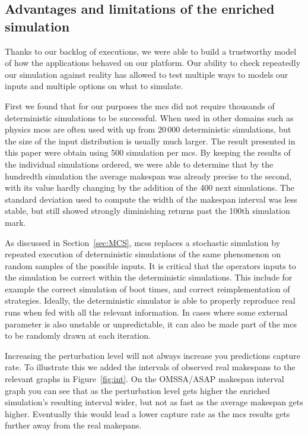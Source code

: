 \documentclass[10pt,conference,compsocconf]{IEEEtran}
\begin{document}
\subsection{Advantages and limitations of the enriched simulation}\label{sec:lim}

Thanks to our backlog of executions, we were able to build a trustworthy model
of how the applications behaved on our platform. Our ability to check repeatedly
our simulation against reality has allowed to test multiple ways to models our
inputs and multiple options on what to simulate. 

First we found that  for our purposes the \ac{mcs} did  not require thousands of
deterministic simulations to  be successful. When used in other  domains such as
physics \acp{mcs} are often used with up from 20\,000 deterministic simulations,
but  the size  of the  input  distribution is  usually much  larger. The  result
presented  in this  paper were  obtain using  500 simulation  per \ac{mcs}.   By
keeping  the results  of the  individual simulations  ordered, we  were able  to
determine  that by  the hundredth  simulation the  average makespan  was already
precise to the second, with its value hardly changing by the addition of the 400
next  simulations. The  standard  deviation used  to compute  the  width of  the
makespan interval was less stable, but still showed strongly diminishing returns
past the 100th simulation mark.

As discussed in Section~\ref{sec:MCS}, \aclp{mcs} replaces a stochastic
simulation by repeated execution of deterministic simulations of the same
phenomenon on random samples of the possible inputs. It is critical that the
operators inputs to the simulation be correct within the deterministic simulations.
This include for example the correct simulation of boot times, and correct
reimplementation of strategies. Ideally, the deterministic simulator is able to
properly reproduce real runs when fed with all the relevant information. In cases
where some external parameter is also unstable or unpredictable, it can also be
made part of the \ac{mcs} to be randomly drawn at each iteration.

Increasing the perturbation level will not always increase you predictions
capture rate. To illustrate this we added the intervals of observed real
makespans to the relevant graphs in Figure~\ref{fig:int}. On the OMSSA/ASAP
makespan interval graph you can see that as the perturbation level gets higher
the enriched simulation's resulting interval wider, but not as fast as the
average makespan gets higher. Eventually this would lead a lower capture rate as
the \ac{mcs} results gets further away from the real makepans. 
\end{document}
